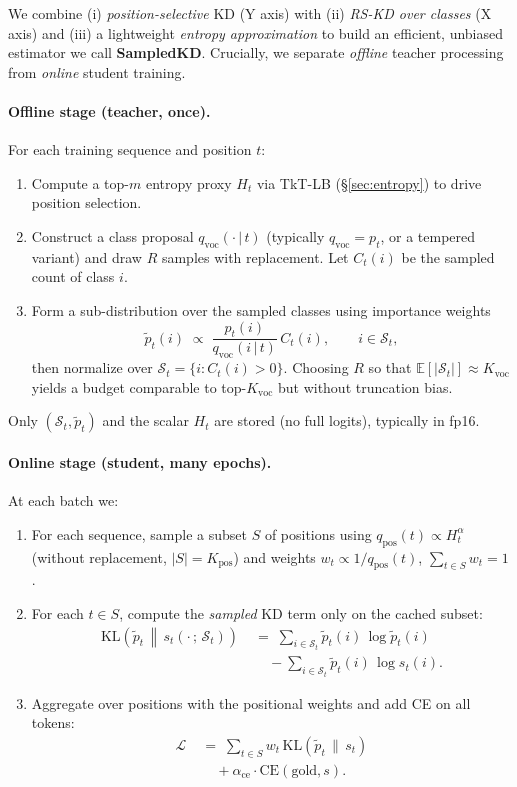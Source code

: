 \documentclass[11pt]{article}
\begin{document}
We combine (i) \emph{position-selective} KD (Y axis) with (ii) \emph{RS-KD over classes} (X axis) and (iii) a lightweight \emph{entropy approximation} to build an efficient, unbiased estimator we call \textbf{SampledKD}.
Crucially, we separate \emph{offline} teacher processing from \emph{online} student training.

\paragraph{Offline stage (teacher, once).}
For each training sequence and position $t$:
\begin{enumerate}
\item Compute a top-$m$ entropy proxy $H_t$ via TkT-LB (\S\ref{sec:entropy}) to drive position selection.
\item Construct a class proposal $q_{\text{voc}}(\cdot\,|\,t)$ (typically $q_{\text{voc}}\!=\!p_t$, or a tempered variant) and draw $R$ samples with replacement. Let $C_t(i)$ be the sampled count of class $i$.
\item Form a sub-distribution over the sampled classes using importance weights
\[
\tilde p_t(i) \;\propto\; \frac{p_t(i)}{q_{\text{voc}}(i\,|\,t)} \, C_t(i), 
\qquad i \in \mathcal{S}_t,
\]
then normalize over $\mathcal{S}_t=\{i: C_t(i)>0\}$. Choosing $R$ so that $\mathbb{E}[|\mathcal{S}_t|]\!\approx\!K_{\text{voc}}$ yields a budget comparable to top-$K_{\text{voc}}$ but without truncation bias.
\end{enumerate}
Only $(\mathcal{S}_t, \tilde p_t)$ and the scalar $H_t$ are stored (no full logits), typically in fp16.

\paragraph{Online stage (student, many epochs).}
At each batch we:
\begin{enumerate}
\item For each sequence, sample a subset $S$ of positions using $q_{\text{pos}}(t)\!\propto\!H_t^\alpha$ (without replacement, $|S|{=}K_{\text{pos}}$) and weights $w_t \propto 1/q_{\text{pos}}(t)$, $\sum_{t\in S}w_t{=}1$.
\item For each $t \in S$, compute the \emph{sampled} KD term only on the cached subset:
\begin{align}
\mathrm{KL}\!\left(\tilde p_t \,\middle\|\, s_t(\cdot\,;\,\mathcal{S}_t)\right)
\;&=\; \sum_{i \in \mathcal{S}_t} \tilde p_t(i)\,\log \tilde p_t(i) \\
&\quad - \sum_{i \in \mathcal{S}_t} \tilde p_t(i)\,\log s_t(i).
\end{align}
\item Aggregate over positions with the positional weights and add CE on all tokens:
\begin{align}
\mathcal{L} \;&=\; \sum_{t\in S} w_t\, \mathrm{KL}\!\left(\tilde p_t \,\|\, s_t\right) \\
&\quad + \alpha_{\text{ce}} \cdot \text{CE}(\text{gold}, s).
\end{align}
\end{enumerate}
\end{document}
